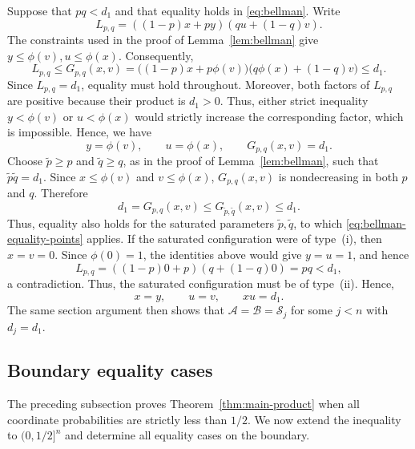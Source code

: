 \documentclass[11pt]{article}
\numberwithin{equation}{section}
\theoremstyle{definition}
\theoremstyle{remark}
\begin{document}
Suppose that $pq<d_1$ and that equality holds in
\eqref{eq:bellman}.  Write
\[
 L_{p,q}
 =
 ((1-p)x+py)(qu+(1-q)v).
\]
The constraints used in the proof of Lemma~\ref{lem:bellman} give
$
 y\leq\phi(v),
 u\leq\phi(x).
$
Consequently,
\[
 L_{p,q}
 \leq
 G_{p,q}(x,v)
 =
 \bigl((1-p)x+p\phi(v)\bigr)
 \bigl(q\phi(x)+(1-q)v\bigr)
 \leq d_1.
\]
Since $L_{p,q}=d_1$, equality must hold throughout.  Moreover, both
factors of $L_{p,q}$ are positive because their product is $d_1>0$.
Thus, either strict inequality $y<\phi(v)$ or
$u<\phi(x)$ would strictly increase the corresponding factor, which is
impossible.  Hence, we have
$$
 y=\phi(v),
 \qquad
 u=\phi(x),
 \qquad
 G_{p,q}(x,v)=d_1.
$$
Choose $\widetilde p\geq p$ and $\widetilde q\geq q$, as in the proof
of Lemma~\ref{lem:bellman}, such that
$
 \widetilde p\widetilde q=d_1.
$
Since $x\leq\phi(v)$ and $v\leq\phi(x)$,
$G_{p,q}(x,v)$ is nondecreasing in both $p$ and $q$.  Therefore
\[
 d_1
 =
 G_{p,q}(x,v)
 \leq
 G_{\widetilde p,\widetilde q}(x,v)
 \leq d_1.
\]
Thus, equality also holds for the saturated parameters
$\widetilde p,\widetilde q$, to which
\eqref{eq:bellman-equality-points} applies.
If the saturated configuration were of type~\textup{(i)}, then
$x=v=0$.  Since $\phi(0)=1$, the identities above would give
$y=u=1$, and hence
\[
 L_{p,q}
 =
 ((1-p)0+p)(q+(1-q)0)
 =
 pq<d_1,
\]
a contradiction.  Thus, the saturated configuration must be of type~\textup{(ii)}.
 Hence,
\[
 x=y,\qquad u=v,\qquad xu=d_1.
\]
The same section argument then shows that
$\mathcal{A}=\mathcal{B}=\mathcal{S}_j$ for some $j<n$ with $d_j=d_1$.

 












\subsection{Boundary equality cases}
\label{sec:endpoint}

The preceding subsection proves Theorem~\ref{thm:main-product} when all
coordinate probabilities are strictly less than $1/2$.  We now extend
the inequality to $(0,1/2]^n$ and determine all equality cases on the
boundary.
\end{document}
